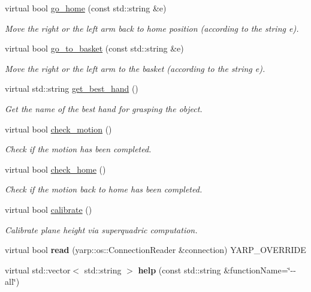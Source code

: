 \begin{DoxyCompactItemize}
\item 
virtual bool \hyperlink{classsuperquadricGrasp__IDL_a67b63b85635a02ab15f9447ad2b1b0dd}{go\+\_\+home} (const std\+::string \&e)
\begin{DoxyCompactList}\small\item\em Move the right or the left arm back to home position (according to the string e). \end{DoxyCompactList}\item 
virtual bool \hyperlink{classsuperquadricGrasp__IDL_abafbd89252eed10caf876ff1965491d0}{go\+\_\+to\+\_\+basket} (const std\+::string \&e)
\begin{DoxyCompactList}\small\item\em Move the right or the left arm to the basket (according to the string e). \end{DoxyCompactList}\item 
virtual std\+::string \hyperlink{classsuperquadricGrasp__IDL_afca9a01bade8e22262e5e70a96d671ae}{get\+\_\+best\+\_\+hand} ()
\begin{DoxyCompactList}\small\item\em Get the name of the best hand for grasping the object. \end{DoxyCompactList}\item 
virtual bool \hyperlink{classsuperquadricGrasp__IDL_afd0cc265ba84c844aee5654f1a713fbd}{check\+\_\+motion} ()
\begin{DoxyCompactList}\small\item\em Check if the motion has been completed. \end{DoxyCompactList}\item 
virtual bool \hyperlink{classsuperquadricGrasp__IDL_a9e11fd04a40c86987500c42f898508ea}{check\+\_\+home} ()
\begin{DoxyCompactList}\small\item\em Check if the motion back to home has been completed. \end{DoxyCompactList}\item 
virtual bool \hyperlink{classsuperquadricGrasp__IDL_ac40ef7c0dd4f0e3600db9aea5cc5c298}{calibrate} ()
\begin{DoxyCompactList}\small\item\em Calibrate plane height via superquadric computation. \end{DoxyCompactList}\item 
virtual bool {\bfseries read} (yarp\+::os\+::\+Connection\+Reader \&connection) Y\+A\+R\+P\+\_\+\+O\+V\+E\+R\+R\+I\+DE\label{classsuperquadricGrasp__IDL_a710271cfee0c9b1a31707d84f194b69b}

\item 
virtual std\+::vector$<$ std\+::string $>$ {\bfseries help} (const std\+::string \&function\+Name=\char`\"{}-\/-\/all\char`\"{})\label{classsuperquadricGrasp__IDL_a226f766d3a3a0ba87e7c1fa0aceb2cb8}

\end{DoxyCompactItemize}


